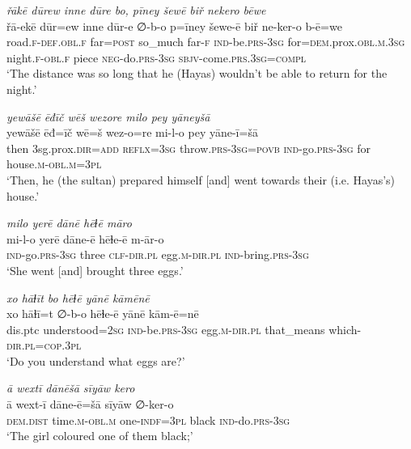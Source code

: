 \ea \label{ŽH.71}
\textit{řākē dūrew inne dūre bo, pīney šewē biř nekero bēwe} \\ 
\gll řā-ekē dūr=ew inne dūr-e ∅-b-o p=īney šewe-ē biř ne-ker-o b-ē=we \\ 
 road\textsc{\textsc{.f}}\textsc{-def}\textsc{.obl}\textsc{\textsc{.f}} far\textsc{=\textsc{post}} so\_much far\textsc{-f} \textsc{ind-}be\textsc{.prs}\textsc{-3sg} for\textsc{=dem}.prox\textsc{.obl}\textsc{.m}\textsc{.3sg} night\textsc{\textsc{.f}}\textsc{-obl}\textsc{\textsc{.f}} piece \textsc{neg-}do\textsc{.prs}\textsc{-3sg} \textsc{sbjv-}come\textsc{.prs}\textsc{.3sg}\textsc{=compl} \\ 
\glt `The distance was so long that he (Hayas) wouldn’t be able to return for the night.'
\z 
 
\ea \label{ŽH.72}
\textit{yewāšē ēđīč wēš wezore milo pey yāneyšā} \\ 
\gll yewāšē ēđ=īč wē=š wez-o=re mi-l-o pey yāne-ī=šā \\ 
 then 3sg.prox\textsc{.dir}\textsc{=add} \textsc{reflx}\textsc{=3sg} throw\textsc{.prs}\textsc{-3sg}\textsc{=\textsc{povb}} \textsc{ind-}go\textsc{.prs}\textsc{-3sg} for house\textsc{.m}\textsc{-obl}\textsc{.m}\textsc{=3pl} \\ 
\glt `Then, he (the sultan) prepared himself [and] went towards their (i.e. Hayas’s) house.'
\z 
 
\ea \label{ŽH.81}
\textit{milo yerē dānē hēɫē māro} \\ 
\gll mi-l-o yerē dāne-ē hēɫe-ē m-ār-o \\ 
 \textsc{ind-}go\textsc{.prs}\textsc{-3sg} three \textsc{clf}\textsc{-dir}\textsc{.pl} egg\textsc{.m}\textsc{-dir}\textsc{.pl} \textsc{ind-}bring\textsc{.prs}\textsc{-3sg} \\ 
\glt `She went [and] brought three eggs.'
\z 
 
\ea \label{ŽH.82}
\textit{xo hāɫīt bo hēɫē yānē kāmēnē} \\ 
\gll xo hāɫī=t ∅-b-o hēɫe-ē yānē kām-ē=nē \\ 
 dis.ptc understood\textsc{=\textsc{2sg}} \textsc{ind-}be\textsc{.prs}\textsc{-3sg} egg\textsc{.m}\textsc{-dir}\textsc{.pl} that\_means which\textsc{-dir}\textsc{.pl}\textsc{=cop}\textsc{.3pl} \\ 
\glt `Do you understand what eggs are?'
\z 
 
\ea \label{ŽH.83}
\textit{ā wextī dānēšā sīyāw kero} \\ 
\gll ā wext-ī dāne-ē=šā sīyāw ∅-ker-o \\ 
 \textsc{dem.dist} time\textsc{.m}\textsc{-obl}\textsc{.m} one\textsc{-indf}\textsc{=3pl} black \textsc{ind-}do\textsc{.prs}\textsc{-3sg} \\ 
\glt `The girl coloured one of them black;'
\z 
 
